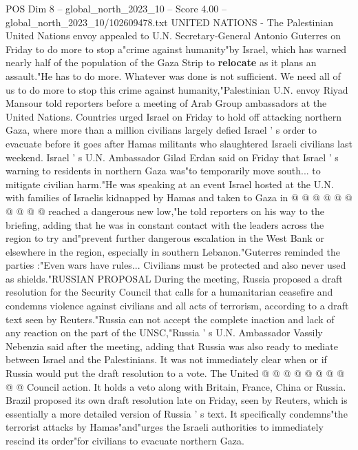 \begin{textsample}{POS Dim 8 – global\_north\_2023\_10 – Score 4.00 – global\_north\_2023\_10/102609478.txt}  \label{ex:f8_pos_206}
UNITED NATIONS - The Palestinian United Nations envoy appealed to U.N.
Secretary-General Antonio Guterres on Friday to do more to stop a"crime against humanity"by Israel, which has warned nearly half of the population of the Gaza Strip to \textbf{relocate} as it plans an assault."He has to do more.
Whatever was done is not sufficient.
We need all of us to do more to stop this crime against humanity,"Palestinian U.N. envoy Riyad Mansour told reporters before a meeting of Arab Group ambassadors at the United Nations.
Countries urged Israel on Friday to hold off attacking northern Gaza, where more than a million civilians largely defied Israel ' s order to evacuate before it goes after Hamas militants who slaughtered Israeli civilians last weekend.
Israel ' s U.N.
Ambassador Gilad Erdan said on Friday that Israel ' s warning to residents in northern Gaza was"to temporarily move south... to mitigate civilian harm."He was speaking at an event Israel hosted at the U.N. with families of Israelis kidnapped by Hamas and taken to Gaza in @ @ @ @ @ @ @ @ @ @ reached a dangerous new low,"he told reporters on his way to the briefing, adding that he was in constant contact with the leaders across the region to try and"prevent further dangerous escalation in the West Bank or elsewhere in the region, especially in southern Lebanon."Guterres reminded the parties :"Even wars have rules...
Civilians must be protected and also never used as shields."RUSSIAN PROPOSAL During the meeting, Russia proposed a draft resolution for the Security Council that calls for a humanitarian ceasefire and condemns violence against civilians and all acts of terrorism, according to a draft text seen by Reuters."Russia can not accept the complete inaction and lack of any reaction on the part of the UNSC,"Russia ' s U.N.
Ambassador Vassily Nebenzia said after the meeting, adding that Russia was also ready to mediate between Israel and the Palestinians.
It was not immediately clear when or if Russia would put the draft resolution to a vote.
The United @ @ @ @ @ @ @ @ @ @ Council action.
It holds a veto along with Britain, France, China or Russia.
Brazil proposed its own draft resolution late on Friday, seen by Reuters, which is essentially a more detailed version of Russia ' s text.
It specifically condemns"the terrorist attacks by Hamas"and"urges the Israeli authorities to immediately rescind its order"for civilians to evacuate northern Gaza.

\end{textsample}
